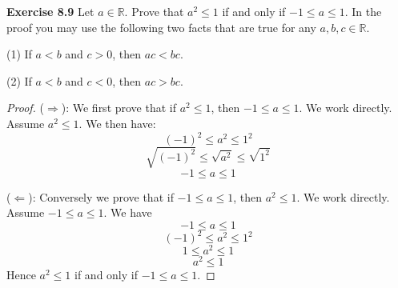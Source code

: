 \documentclass[12pt,oneside]{article}
\newenvironment{exercise}[1]{\vspace{.1in}\noindent\textbf{Exercise #1 \hspace{.05em}}}{}
\newcommand{\R}{\mathbb{R}}
\begin{document}

\begin{exercise}{8.9}
Let $a \in \R$. Prove that $a^2 \leq 1$ if and only if $-1 \leq a \leq 1$. In the proof you may use the following two facts that are true for any $a,b,c \in \R$.

(1) If $a < b$ and $c > 0$, then $ac < bc$.

(2) If $a < b$ and $c < 0$, then $ac > bc$.
\end{exercise}

\begin{proof}
($\Rightarrow$): We first prove that if $a^2 \leq 1$, then $-1 \leq a \leq 1$. We work directly. Assume $a^2 \leq 1$. We then have:
\[(-1)^2 \leq a^2 \leq 1^2\]
\[\sqrt{(-1)^2} \leq \sqrt{a^2} \leq \sqrt{1^2}\]
\[-1 \leq a \leq 1\]

($\Leftarrow$): Conversely we prove that if $-1 \leq a \leq 1$, then $a^2 \leq 1$. We work directly. Assume $-1 \leq a \leq 1$. We have
\[-1 \leq a \leq 1\]
\[(-1)^2 \leq a^2 \leq 1^2\]
\[1 \leq a^2 \leq 1\]
\[a^2 \leq 1\]
Hence $a^2 \leq 1$ if and only if $-1 \leq a \leq 1$.
\end{proof}


\end{document}
